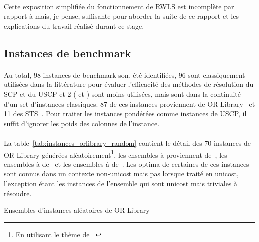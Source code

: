 \documentclass[a4paper,11pt,twoside,french,report]{../common/simplem}
\begin{document}
				\paragraph*{}
					Cette exposition simplifiée du fonctionnement de \gls{RWLS} est incomplète par rapport à \cite{Gao2015} mais, je pense, suffisante pour aborder la suite de ce rapport et les explications du travail réalisé durant ce stage.
			\subsection{Instances de benchmark}
				\paragraph*{}
					Au total, 98 instances de benchmark sont été identifiées, 96 sont classiquement utilisées dans la littérature pour évaluer l'efficacité des méthodes de résolution du \gls{SCP} et du \gls{USCP} et 2 ( et ) sont moins utilisées, mais sont dans la continuité d'un set d'instances classiques. 87 de ces instances proviennent de OR-Library~\cite{Beasley1990b} et 11 des \gls{STS}~\cite{Fulkerson1974}. Pour traiter les instances pondérées comme instances de \gls{USCP}, il suffit d'ignorer les poids des colonnes de l'instance.
				\paragraph*{}
					La table~\ref{tab:instances_orlibrary_random} contient le détail des 70 instances de OR-Library générées aléatoirement\footnote{En utilisant le thème de \citeauthor{Balas1980}~\cite{Balas1980}}, les ensembles  à  proviennent de~\cite{Balas1980}, les ensembles  à  de~\cite{Beasley1987} et les ensembles  à  de~\cite{Beasley1990a}. Les optima de certaines de ces instances sont connus dans un contexte non-unicost mais pas lorsque traité en unicost, l'exception étant les instances de l'ensemble  qui sont unicost mais triviales à résoudre.
				\begin{table}[H]
					\centering
					\caption{Ensembles d'instances aléatoires de OR-Library}
					\label{tab:instances_orlibrary_random}
					
				\end{table}
\end{document}
